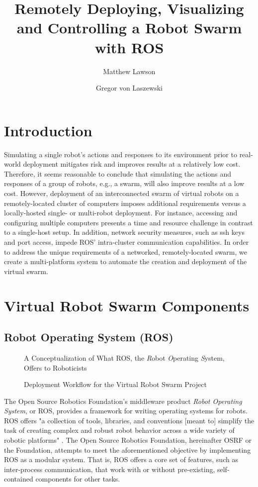\documentclass[9pt,twocolumn,twoside]{../../styles/osajnl}
\title{Remotely Deploying, Visualizing and Controlling a Robot Swarm with ROS}
\author[1]{Matthew Lawson}
\author[1,*]{Gregor von Laszewski}
\affil[1]{School of Informatics and Computing, Bloomington, IN 47408, U.S.A.}
\affil[*]{Corresponding authors: laszewski@gmail.com}
\begin{document}
\maketitle

\section{Introduction}
Simulating a single robot's actions and responses to its environment prior to real-world deployment mitigates risk and improves results at a relatively low cost. Therefore, it seems reasonable to conclude that simulating the actions and responses of a group of robots, e.g., a swarm, will also improve results at a low cost.  However, deployment of an interconnected swarm of virtual robots on a remotely-located cluster of computers imposes additional requirements versus a locally-hosted single- or multi-robot deployment.  For instance, accessing and configuring multiple computers presents a time and resource challenge in contrast to a single-host setup.  In addition, network security measures, such as ssh keys and port access, impede ROS' intra-cluster communication capabilities.  In order to address the unique requirements of a networked, remotely-located swarm, we create a multi-platform system to automate the creation and deployment of the virtual swarm. 

\section{Virtual Robot Swarm Components}

\subsection{Robot Operating System (ROS) \cite{paper2}}
\begin{figure*}[htbp]
\centering
{}
\caption{A Conceptualization of What ROS, the \textit{R}obot \textit{O}perating \textit{S}ystem, Offers to Roboticists \cite{www-ros-ros-is}}
\label{fig:rosOverview}
\end{figure*}

\begin{figure}[htbp]
\centering
{}
\caption{Deployment Workflow for the Virtual Robot Swarm Project}
\label{fig:deployWorkflow}
\end{figure}

The Open Source Robotics Foundation's middleware product \textit{Robot Operating System}, or ROS, provides a framework for writing operating systems for robots.  ROS offers "a collection of tools, libraries, and conventions [meant to] simplify the task of creating complex and robust robot behavior across a wide variety of robotic platforms" \cite{www-ros-about}. The Open Source Robotics Foundation, hereinafter OSRF or the Foundation, attempts to meet the aforementioned objective by implementing ROS as a modular system.  That is, ROS offers a core set of features, such as inter-process communication, that work with or without pre-existing, self-contained components for other tasks.
\end{document}
